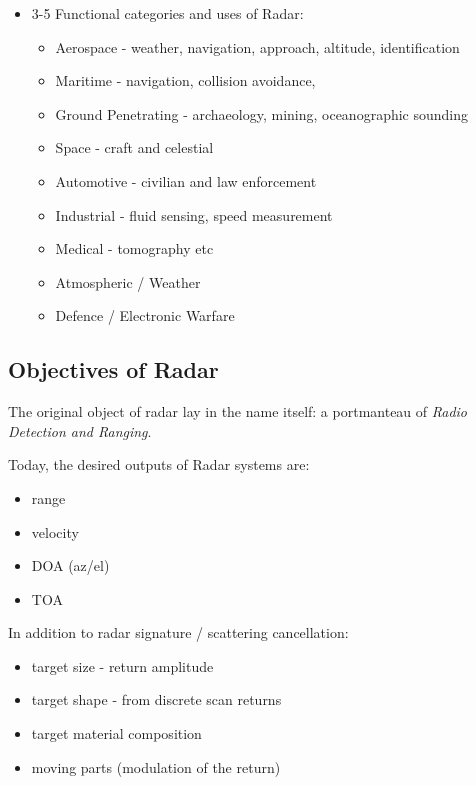 \begin{itemize}
    \item 3-5 Functional categories and uses of Radar: \cite{}
    \begin{itemize}
        \item Aerospace - weather, navigation, approach, altitude, identification
        \item Maritime - navigation, collision avoidance,  
        \item Ground Penetrating - archaeology, mining, oceanographic sounding
        \item Space - craft and celestial
        \item Automotive - civilian and law enforcement
        \item Industrial - fluid sensing, speed measurement
        \item Medical - tomography etc
        \item Atmospheric / Weather
        \item Defence / Electronic Warfare
   \end{itemize}
\end{itemize}
%
\subsection{Objectives of Radar}

The original object of radar lay in the name itself: a portmanteau of \textit{Radio Detection and Ranging}. \cite{policy_radar_1945}

Today, the desired outputs of Radar systems are:

\begin{itemize}
    \item range
    \item velocity
    \item DOA (az/el)
    \item TOA
\end{itemize}

In addition to radar signature / scattering cancellation:
\begin{itemize}
    \item target size - return amplitude
    \item target shape - from discrete scan returns
    \item target material composition
    \item moving parts (modulation of the return)
\end{itemize}

